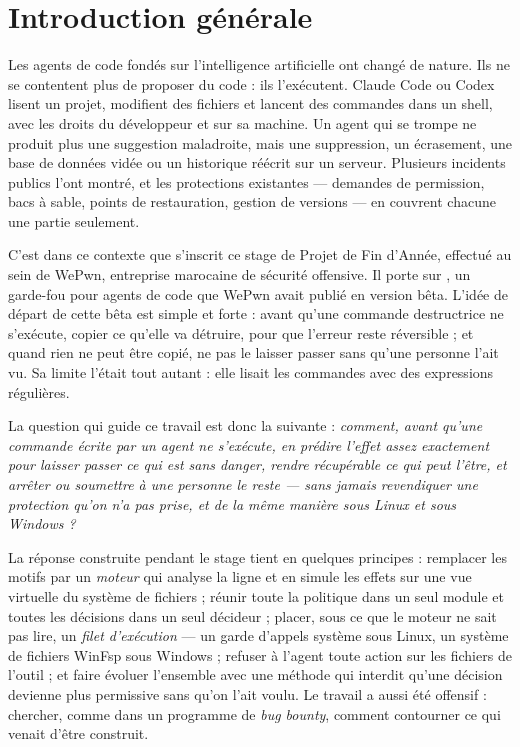 \chapter*{Introduction générale}

Les agents de code fondés sur l'intelligence artificielle ont changé de nature. Ils ne se
contentent plus de proposer du code : ils l'exécutent. Claude Code ou Codex lisent un projet,
modifient des fichiers et lancent des commandes dans un shell, avec les droits du développeur
et sur sa machine. Un agent qui se trompe ne produit plus une suggestion maladroite, mais une
suppression, un écrasement, une base de données vidée ou un historique réécrit sur un serveur.
Plusieurs incidents publics l'ont montré, et les protections existantes --- demandes de
permission, bacs à sable, points de restauration, gestion de versions --- en couvrent chacune
une partie seulement.

C'est dans ce contexte que s'inscrit ce stage de Projet de Fin d'Année, effectué au sein de
WePwn, entreprise marocaine de sécurité offensive. Il porte sur \demo{}, un garde-fou pour
agents de code que WePwn avait publié en version bêta. L'idée de départ de cette bêta est
simple et forte : avant qu'une commande destructrice ne s'exécute, copier ce qu'elle va
détruire, pour que l'erreur reste réversible ; et quand rien ne peut être copié, ne pas le
laisser passer sans qu'une personne l'ait vu. Sa limite l'était tout autant : elle lisait les
commandes avec des expressions régulières.

La question qui guide ce travail est donc la suivante : \emph{comment, avant qu'une commande
écrite par un agent ne s'exécute, en prédire l'effet assez exactement pour laisser passer ce
qui est sans danger, rendre récupérable ce qui peut l'être, et arrêter ou soumettre à une
personne le reste --- sans jamais revendiquer une protection qu'on n'a pas prise, et de la même
manière sous Linux et sous Windows ?}

La réponse construite pendant le stage tient en quelques principes : remplacer les motifs par
un \emph{moteur} qui analyse la ligne et en simule les effets sur une vue virtuelle du système
de fichiers ; réunir toute la politique dans un seul module et toutes les décisions dans un
seul décideur ; placer, sous ce que le moteur ne sait pas lire, un \emph{filet d'exécution} ---
un garde d'appels système sous Linux, un système de fichiers WinFsp sous Windows ; refuser à
l'agent toute action sur les fichiers de l'outil ; et faire évoluer l'ensemble avec une méthode
qui interdit qu'une décision devienne plus permissive sans qu'on l'ait voulu. Le travail a
aussi été offensif : chercher, comme dans un programme de \textit{bug bounty}, comment
contourner ce qui venait d'être construit.

